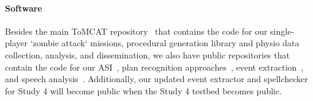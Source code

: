 \documentclass[11pt,article,oneside]{memoir}
\begin{document}
\paragraph{Software} Besides the main ToMCAT repository~\citep{tomcat_repo}
that contains the code for our single-player `zombie attack` missions,
procedural generation library and physio data collection, analysis, and
dissemination, we also have public repositories that contain the code for our
ASI~\citep{tomcat_asi}, plan recognition approaches~\citep{tomcat_planrec},
event extraction~\citep{tomcat-text}, and speech
analysis~\citep{tomcat_speech}. Additionally, our updated event extractor and
spellchecker for Study 4 will become public when the Study 4 testbed becomes
public.


\newpage
\printbibliography
\end{document}
